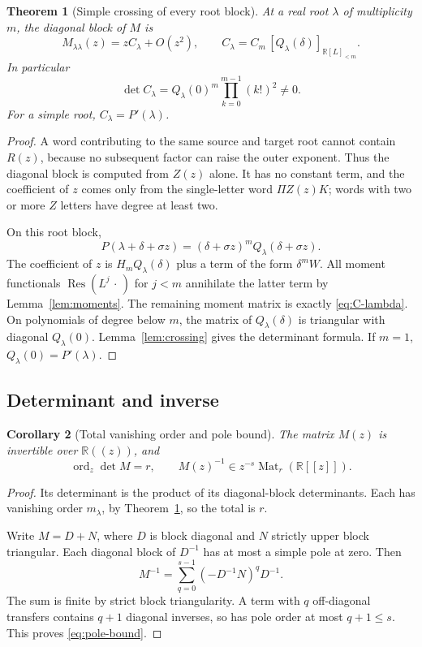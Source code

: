 \documentclass[11pt,a4paper]{article}
\numberwithin{equation}{section}
\newtheorem{theorem}{Theorem}[section]
\newtheorem{corollary}[theorem]{Corollary}
\theoremstyle{definition}
\theoremstyle{remark}
\theoremstyle{definition}
\newcommand{\R}{\mathbb R}
\newcommand{\Res}{\operatorname{Res}}
\newcommand{\ord}{\operatorname{ord}}
\newcommand{\Mat}{\operatorname{Mat}}
\begin{document}
\begin{theorem}[Simple crossing of every root block]
\label{thm:crossing}
At a real root $\lambda$ of multiplicity $m$, the diagonal block of $M$ is
\begin{equation}
 M_{\lambda\lambda}(z)=zC_\lambda+O(z^2),
 \qquad
 C_\lambda=C_m\,[Q_\lambda(\delta)]_{\R[L]_{<m}}.
 \label{eq:C-lambda}
\end{equation}
In particular
\begin{equation}
 \det C_\lambda=Q_\lambda(0)^m
 \prod_{k=0}^{m-1}(k!)^2\ne0.
 \label{eq:C-lambda-det}
\end{equation}
For a simple root, $C_\lambda=P'(\lambda)$.
\end{theorem}
\begin{proof}
A word contributing to the same source and target root cannot contain $R(z)$, because no subsequent factor can raise the outer exponent. Thus the diagonal block is computed from $Z(z)$ alone. It has no constant term, and the coefficient of $z$ comes only from the single-letter word $\Pi Z(z)K$; words with two or more $Z$ letters have degree at least two.

On this root block,
\[
 P(\lambda+\delta+\sigma z)
 =(\delta+\sigma z)^m Q_\lambda(\delta+\sigma z).
\]
The coefficient of $z$ is $H_mQ_\lambda(\delta)$ plus a term of the form $\delta^m W$. All moment functionals $\Res(L^j\,\cdot\,)$ for $j<m$ annihilate the latter term by Lemma~\ref{lem:moments}. The remaining moment matrix is exactly \eqref{eq:C-lambda}. On polynomials of degree below $m$, the matrix of $Q_\lambda(\delta)$ is triangular with diagonal $Q_\lambda(0)$. Lemma~\ref{lem:crossing} gives the determinant formula. If $m=1$, $Q_\lambda(0)=P'(\lambda)$.
\end{proof}

\subsection{Determinant and inverse}
\begin{corollary}[Total vanishing order and pole bound]
\label{cor:pole}
The matrix $M(z)$ is invertible over $\R((z))$, and
\begin{equation}
 \ord_z\det M=r,
 \qquad
 M(z)^{-1}\in z^{-s}\Mat_r(\R[[z]]).
 \label{eq:pole-bound}
\end{equation}
\end{corollary}
\begin{proof}
Its determinant is the product of its diagonal-block determinants. Each has vanishing order $m_\lambda$, by Theorem~\ref{thm:crossing}, so the total is $r$.

Write $M=D+N$, where $D$ is block diagonal and $N$ strictly upper block triangular. Each diagonal block of $D^{-1}$ has at most a simple pole at zero. Then
\[
 M^{-1}=\sum_{q=0}^{s-1}(-D^{-1}N)^qD^{-1}.
\]
The sum is finite by strict block triangularity. A term with $q$ off-diagonal transfers contains $q+1$ diagonal inverses, so has pole order at most $q+1\le s$. This proves \eqref{eq:pole-bound}.
\end{proof}
\end{document}
